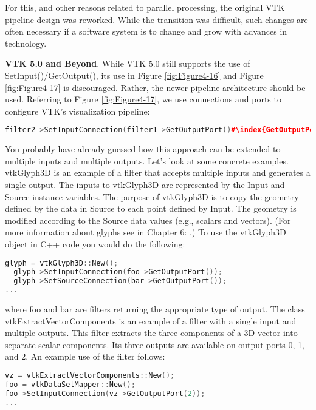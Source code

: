 For this, and other reasons related to parallel processing, the original VTK pipeline design was reworked. While the transition was difficult, such changes are often necessary if a software system is to change and grow with advances in technology.

\textbf{VTK 5.0 and Beyond}. While VTK 5.0 still supports the use of SetInput()/GetOutput(), its use in Figure \ref{fig:Figure4-16} and Figure \ref{fig:Figure4-17} is discouraged. Rather, the newer pipeline architecture should be used. Referring to Figure \ref{fig:Figure4-17}, we use connections and ports to configure VTK's visualization pipeline:

\begin{lstlisting}[language=C++, caption={}, numbers=none, frame=none, escapechar=\# ]
filter2->SetInputConnection(filter1->GetOutputPort()#\index{GetOutputPort()}#);
\end{lstlisting}

You probably have already guessed how this approach can be extended to multiple inputs and multiple outputs. Let's look at some concrete examples. vtkGlyph3D is an example of a filter that accepts multiple inputs and generates a single output. The inputs to vtkGlyph3D are represented by the Input and Source instance variables. The purpose of vtkGlyph3D is to copy the geometry defined by the data in Source to each point defined by Input. The geometry is modified according to the Source data values (e.g., scalars and vectors). (For more information about glyphs see  in Chapter 6: .) To use the vtkGlyph3D object in C++ code you would do the following:

\begin{lstlisting}[language=C++, caption={}, numbers=none, frame=none]
glyph = vtkGlyph3D::New();
  glyph->SetInputConnection(foo->GetOutputPort());
  glyph->SetSourceConnection(bar->GetOutputPort());
...
\end{lstlisting}

where foo and bar are filters returning the appropriate type of output. The class vtkExtractVectorComponents is an example of a filter with a single input and multiple outputs. This filter extracts the three components of a 3D vector into separate scalar components. Its three outputs are available on output ports 0, 1, and 2. An example use of the filter follows:

\begin{lstlisting}[language=C++, caption={}, numbers=none, frame=none]
vz = vtkExtractVectorComponents::New();
foo = vtkDataSetMapper::New();
foo->SetInputConnection(vz->GetOutputPort(2));
...
\end{lstlisting}

